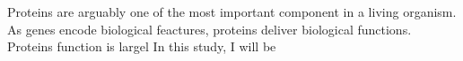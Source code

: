 Proteins are arguably one of the most important component in a living organism. As genes encode biological feactures, proteins deliver biological functions. Proteins function is largel In this study, I will be 